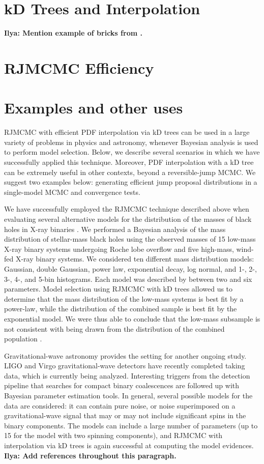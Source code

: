 \documentclass[prd,preprint]{revtex4}
\newcommand{\ilya}[1]{{\color{red} \bf Ilya: #1}}
\begin{document}
\section{kD Trees and Interpolation}

\ilya{Mention example of bricks from \cite{Littenberg2009}.}

\section{RJMCMC Efficiency}

\section{Examples and other uses} \label{sec:examples}

RJMCMC with efficient PDF interpolation via kD trees can be used in a large variety of problems in physics and astronomy, whenever Bayesian analysis is used to perform model selection.  Below, we describe several scenarios in which we have successfully applied this technique.  Moreover, PDF interpolation with a kD tree can be extremely useful in other contexts, beyond a reversible-jump MCMC.  We suggest two examples below: generating efficient jump proposal distributions in a single-model MCMC and convergence tests.


We have successfully employed the RJMCMC technique described above when evaluating several alternative models for the distribution of the masses of black holes in X-ray binaries \cite{Farr:2010}.  We performed a Bayesian analysis of the mass distribution of stellar-mass black holes using the observed masses of 15 low-mass X-ray binary systems undergoing Roche lobe overflow and five high-mass, wind-fed X-ray binary systems.  We considered ten different mass distribution models: Gaussian, double Gaussian, power law, exponential decay, log normal, and 1-, 2-, 3-, 4-, and 5-bin histograms.  Each model was described by between two and six parameters.  Model selection using RJMCMC with kD trees allowed us to determine that the mass distribution of the low-mass systems is  best fit by a power-law, while the distribution of the combined sample is best fit by the exponential model.  We were thus able to conclude that the low-mass subsample is not consistent with being drawn from the distribution of the combined population \cite{Farr:2010}.

Gravitational-wave astronomy provides the setting for another ongoing study.  LIGO and Virgo gravitational-wave detectors have recently completed taking data, which is currently being analyzed.  Interesting triggers from the detection pipeline that  searches for compact binary coalescences are followed up with Bayesian parameter estimation tools.  In general, several possible models for the data are considered: it can contain pure noise, or noise superimposed on a gravitational-wave signal that may or may not include significant spins in the binary components.  The models can include a large number of parameters (up to 15 for the model with two spinning components), and RJMCMC with interpolation via kD trees is again successful at computing the model evidences. \ilya{Add references throughout this paragraph.}
\end{document}
